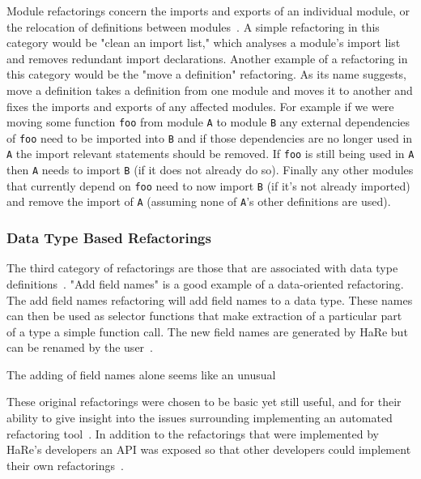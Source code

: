 Module refactorings concern the imports and exports of an individual module, or the relocation of definitions between modules~\citep{huiqingThesis}. A simple refactoring in this category would be "clean an import list," which analyses a module's import list and removes redundant import declarations. Another example of a refactoring in this category would be the "move a definition" refactoring. As its name suggests, move a definition takes a definition from one module and moves it to another and fixes the imports and exports of any affected modules. For example if we were moving some function \texttt{foo} from module \texttt{A} to module \texttt{B} any external dependencies of \texttt{foo} need to be imported into \texttt{B} and if those dependencies are no longer used in \texttt{A} the import relevant statements should be removed. If \texttt{foo} is still being used in \texttt{A} then \texttt{A} needs to import \texttt{B} (if it does not already do so). Finally any other modules that currently depend on \texttt{foo} need to now import \texttt{B} (if it's not already imported) and remove the import of \texttt{A} (assuming none of \texttt{A}'s other definitions are used).

\subsubsection{Data Type Based Refactorings}

The third category of refactorings are those that are associated with data type definitions~\citep{huiqingThesis}. "Add field names" is a good example of a data-oriented refactoring.  The add field names refactoring will add field names to a data type. These names can then be used as selector functions that make extraction of a particular part of a type a simple function call. The new field names are generated by HaRe but can be renamed by the user~\citep{huiqingThesis}.

The adding of field names alone seems like an unusual 

These original refactorings were chosen to be basic yet still useful, and for their ability to give insight into the issues surrounding implementing an automated refactoring tool~\citep{huiqingThesis}. In addition to the refactorings that were implemented by HaRe's developers an API was exposed so that other developers could implement their own refactorings~\citep{hareApi}.


